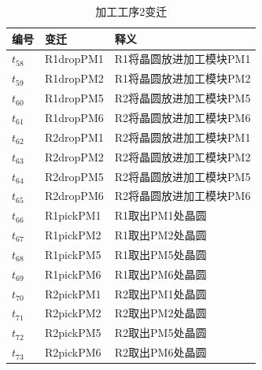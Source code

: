 \begin{table}[H]
	\centering
	\caption{加工工序2变迁}
	\begin{tabular}{lll}
		\toprule
		编号 & 变迁      & 释义                    \\
		\hline
		$t_{58}$  & R1dropPM1 & R1将晶圆放进加工模块PM1 \\
		$t_{59}$  & R1dropPM2 & R1将晶圆放进加工模块PM2 \\
		$t_{60}$  & R1dropPM5 & R2将晶圆放进加工模块PM5 \\
		$t_{61}$  & R1dropPM6 & R2将晶圆放进加工模块PM6 \\
		$t_{62}$  & R2dropPM1 & R2将晶圆放进加工模块PM1 \\
		$t_{63}$  & R2dropPM2 & R2将晶圆放进加工模块PM2 \\
		$t_{64}$  & R2dropPM5 & R2将晶圆放进加工模块PM5 \\
		$t_{65}$  & R2dropPM6 & R2将晶圆放进加工模块PM6 \\
		$t_{66}$  & R1pickPM1 & R1取出PM1处晶圆         \\
		$t_{67}$  & R1pickPM2 & R1取出PM2处晶圆         \\
		$t_{68}$  & R1pickPM5 & R1取出PM5处晶圆         \\
		$t_{69}$  & R1pickPM6 & R1取出PM6处晶圆         \\
		$t_{70}$  & R2pickPM1 & R2取出PM1处晶圆         \\
		$t_{71}$  & R2pickPM2 & R2取出PM2处晶圆         \\
		$t_{72}$  & R2pickPM5 & R2取出PM5处晶圆         \\
		$t_{73}$  & R2pickPM6 & R2取出PM6处晶圆         \\
		\bottomrule
	\end{tabular}
\end{table}

